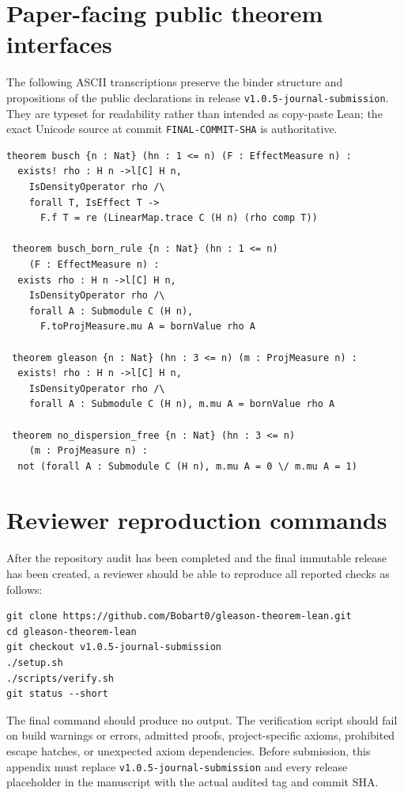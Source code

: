 \documentclass[pdflatex,sn-mathphys-num]{sn-jnl}
\providecommand{\passthrough}[1]{#1}
\theoremstyle{thmstyleone}
\theoremstyle{thmstylethree}
\begin{document}
\appendix

\section{Paper-facing public theorem interfaces}\label{app:interfaces}

The following ASCII transcriptions preserve the binder structure and propositions of the public declarations in release \passthrough{\lstinline!v1.0.5-journal-submission!}. They are typeset for readability rather than intended as copy-paste Lean; the exact Unicode source at commit \passthrough{\lstinline!FINAL-COMMIT-SHA!} is authoritative.

\begin{lstlisting}
theorem busch {n : Nat} (hn : 1 <= n) (F : EffectMeasure n) :
  exists! rho : H n ->l[C] H n,
    IsDensityOperator rho /\
    forall T, IsEffect T ->
      F.f T = re (LinearMap.trace C (H n) (rho comp T))

 theorem busch_born_rule {n : Nat} (hn : 1 <= n)
    (F : EffectMeasure n) :
  exists rho : H n ->l[C] H n,
    IsDensityOperator rho /\
    forall A : Submodule C (H n),
      F.toProjMeasure.mu A = bornValue rho A

 theorem gleason {n : Nat} (hn : 3 <= n) (m : ProjMeasure n) :
  exists! rho : H n ->l[C] H n,
    IsDensityOperator rho /\
    forall A : Submodule C (H n), m.mu A = bornValue rho A

 theorem no_dispersion_free {n : Nat} (hn : 3 <= n)
    (m : ProjMeasure n) :
  not (forall A : Submodule C (H n), m.mu A = 0 \/ m.mu A = 1)
\end{lstlisting}

\section{Reviewer reproduction commands}\label{app:reproduction}

After the repository audit has been completed and the final immutable release has been created, a reviewer should be able to reproduce all reported checks as follows:

\begin{lstlisting}
git clone https://github.com/Bobart0/gleason-theorem-lean.git
cd gleason-theorem-lean
git checkout v1.0.5-journal-submission
./setup.sh
./scripts/verify.sh
git status --short
\end{lstlisting}

The final command should produce no output. The verification script should fail on build warnings or errors, admitted proofs, project-specific axioms, prohibited escape hatches, or unexpected axiom dependencies. Before submission, this appendix must replace \passthrough{\lstinline!v1.0.5-journal-submission!} and every release placeholder in the manuscript with the actual audited tag and commit SHA.
\end{document}
